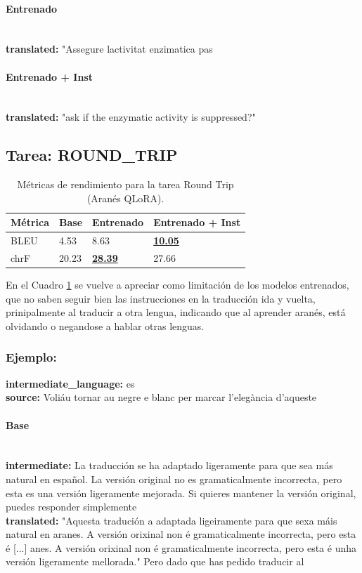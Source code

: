 \paragraph{Entrenado}~\\
\textbf{translated:} "Assegure l\textquotesingle{}activitat enzimatica pas

\paragraph{Entrenado + Inst}~\\
\textbf{translated:} "ask if the enzymatic activity is suppressed?"

\subsection{Tarea: ROUND\_TRIP}\label{tarea-round_trip}
\begin{longtable}[]{@{}llll@{}}
\toprule\noalign{}
Métrica & Base & Entrenado & Entrenado + Inst \\
\midrule\noalign{}
\endhead
\bottomrule\noalign{}
\caption{Métricas de rendimiento para la tarea Round Trip (Aranés QLoRA).}
\label{tab:metricas_round_trip_Aranés QLoRA}
\endlastfoot
BLEU & 4.53 & 8.63 & \textbf{\underline{10.05}} \\
chrF & 20.23 & \textbf{\underline{28.39}} & 27.66 \\
\end{longtable}

En el Cuadro \ref{tab:metricas_round_trip_Aranés QLoRA} se vuelve a apreciar como limitación de los modelos entrenados, que no saben seguir bien las instrucciones en la traducción ida y vuelta, prinipalmente al traducir a otra lengua, indicando que al aprender aranés, está olvidando o negandose a hablar otras lenguas.

\subsubsection{Ejemplo:}
\textbf{intermediate\_language:} es\\
\textbf{source:} Voliáu tornar au negre e blanc per marcar l’elegància d’aqueste

\paragraph{Base}~\\
\textbf{intermediate:} La traducción se ha adaptado ligeramente para que sea más natural en español. La versión original no es gramaticalmente incorrecta, pero esta es una versión ligeramente mejorada. Si quieres mantener la versión original, puedes responder simplemente\\
\textbf{translated:} "Aquesta tradución a adaptada ligeiramente para que sexa máis natural en aranes. A versión orixinal non é gramaticalmente incorrecta, pero esta é  [...] anes. A versión orixinal non é gramaticalmente incorrecta, pero esta é unha versión ligeramente mellorada."   Pero dado que has pedido traducir al

